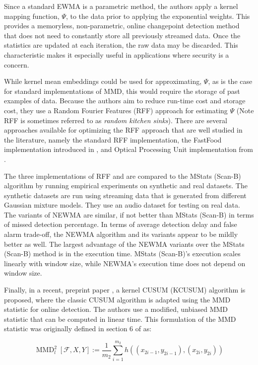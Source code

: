 Since a standard EWMA is a parametric method, the authors apply a kernel mapping function, $\Psi$, to the data prior to applying the exponential weights. This provides a memoryless, non-parametric, online changepoint detection method that does not need to constantly store all previously streamed data. Once the statistics are updated at each iteration, the raw data may be discarded. This characteristic makes it especially useful in applications where security is a concern.

While kernel mean embeddings could be used for approximating, $\Psi$, as is the case for standard implementations of MMD, this would require the storage of past examples of data. Because the authors aim to reduce run-time cost and storage cost, they use a Random Fourier Features (RFF) approach for estimating $\Psi$ (Note RFF is sometimes referred to as \textit{random kitchen sinks}). There are several approaches available for optimizing the RFF approach that are well studied in the literature, namely the standard RFF implementation, the FastFood implementation introduced in \cite{le2014fastfood}, and Optical Processing Unit implementation from \cite{saade2016random}. 

The three implementations of RFF and are compared to the MStats (Scan-B) algorithm by running empirical experiments on synthetic and real datasets. The synthetic datasets are run using streaming data that is generated from different Gaussian mixture models. They use an audio dataset for testing on real data. The variants of NEWMA are similar, if not better than MStats (Scan-B) in terms of missed detection percentage. In terms of average detection delay and false alarm trade-off, the NEWMA algorithm and its variants appear to be mildly better as well. The largest advantage of the NEWMA variants over the MStats (Scan-B) method is in the execution time. MStats (Scan-B)'s execution scales linearly with window size, while NEWMA's execution time does not depend on window size.

Finally, in a recent, preprint paper \cite{flynn2019change}, a kernel CUSUM (KCUSUM) algorithm is proposed, where the classic CUSUM algorithm is adapted using the MMD statistic for online detection. The authors use a modified, unbiased MMD statistic that can be computed in linear time. This formulation of the MMD statistic was originally defined in section 6 of \cite{gretton2012kernel} as:

$$\operatorname{MMD}_{l}^{2}[\mathcal{F}, X, Y] :=\frac{1}{m_{2}} \sum_{i=1}^{m_{2}} h\left(\left(x_{2 i-1}, y_{2 i-1}\right),\left(x_{2 i}, y_{2 i}\right)\right)$$

